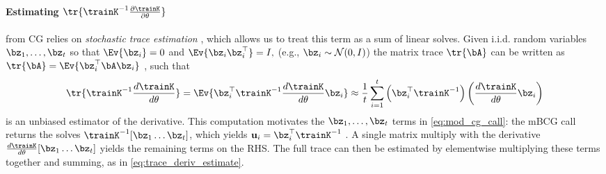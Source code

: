 \paragraph{Estimating $\tr{ \trainK^{-1} \frac{\partial \trainK}{\partial \theta} }$}
from CG relies on \emph{stochastic trace estimation} \cite{avron2011randomized,fitzsimons2016improved,hutchinson1990stochastic}, which allows us to treat this term as a sum of linear solves.
Given i.i.d. random variables $\bz_1, \ldots, \bz_t$ so that $\Ev{\bz_i}=0$ and $\Ev{\bz_i \bz_i^{\top}}=I,
$ (e.g., $\bz_{i} \sim \mathcal{N}(0, I)$)
the matrix trace $\tr{\bA}$ can be written as
$
  \tr{\bA} = \Ev{\bz_i^\top \bA\bz_i}
$
, such that
%
\begin{equation}
  \label{eq:trace_deriv_estimate}
  \tr{\trainK^{-1}\frac{d\trainK}{d\theta}}  = \Ev{\bz_i^\top  \trainK^{-1}\frac{d\trainK}{d\theta} \bz_i} \approx \frac{1}{t}\sum_{i=1}^{t}\left(\bz_{i}^\top \trainK^{-1}\right)\left(\frac{d\trainK}{d\theta}\bz_{i} \right)
\end{equation}
%
is an unbiased estimator of the derivative. This computation motivates the $\bz_1, \ldots, \bz_t$ terms in \eqref{eq:mod_cg_call}:
the mBCG call returns the solves $\trainK^{-1}[\bz_1 \ldots \bz_t]$, which yields $\mathbf{u}_i=\bz_{i}^\top \trainK^{-1}$ . A single matrix multiply with the derivative $\frac{d\trainK}{d\theta}[\bz_1 \ldots \bz_t]$ yields the remaining terms on the RHS. The full trace can then be estimated by elementwise multiplying these terms together and summing, as in
\eqref{eq:trace_deriv_estimate}.

